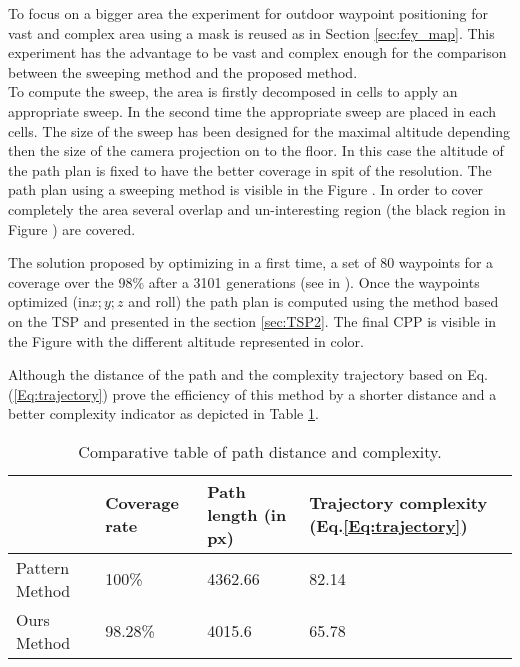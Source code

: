 To focus on a bigger area the experiment for outdoor waypoint positioning for vast and complex area using  a mask  is reused as in Section \ref{sec:fey_map}. This experiment has the advantage to be vast and complex enough for the comparison between the  sweeping method and the  proposed method.\\
To compute the sweep,  the area is firstly decomposed in cells to apply an appropriate sweep. In the second time  the appropriate sweep are placed in each cells. The size of the sweep has been designed for the maximal altitude  depending then the size of the camera projection on to the floor. In this case the altitude of the path plan is fixed to have the better coverage in spit of the resolution. 
The path plan using a sweeping method is visible in the Figure . In order to cover completely the area several overlap and un-interesting region (the black region in Figure ) are covered. 

The solution proposed by optimizing in a first time, a set of 80 waypoints for a coverage over the 98\% after a 3101 generations (see in ). Once the waypoints optimized (in$x;y;z$ and roll) the path plan is computed using the method based on the TSP  and presented in the section \ref{sec:TSP2}. The final CPP  is visible in  the Figure  with the different altitude represented in color.

 Although the distance of the path and the complexity trajectory based on Eq.(\ref{Eq:trajectory}) prove the efficiency of this method by a shorter distance and a better complexity indicator as depicted in Table \ref{table:trajectory}.\\ 
 \begin{table}[t]
\begin{tabular}{|p{1.5cm}|p{1.8cm}|p{1.8cm}|p{1.8cm}|}
  \hline
   &Coverage rate & Path length (in px) & Trajectory complexity (Eq.\ref{Eq:trajectory})  \\  \hline
  Pattern Method &  100\% & 4362.66 &82.14 \\ \hline
  Ours Method &  98.28\% & 4015.6 &65.78 \\ \hline
\end{tabular}
\caption{Comparative table  of path distance and complexity.}\label{table:trajectory}
\end{table}





